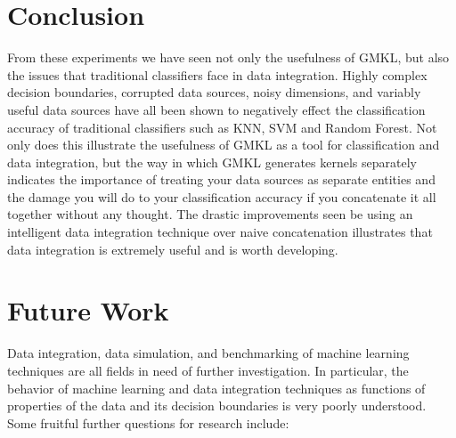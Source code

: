 \documentclass{article}
\begin{document}
\section*{Conclusion}
From these experiments we have seen not only the usefulness of GMKL, but also the issues that traditional classifiers face in data integration. Highly complex decision boundaries, corrupted data sources, noisy dimensions, and variably useful data sources have all been shown to negatively effect the classification accuracy of traditional classifiers such as KNN, SVM and Random Forest. Not only does this illustrate the usefulness of GMKL as a tool for classification and data integration, but the way in which GMKL generates kernels separately indicates the importance of treating your data sources as separate entities and the damage you will do to your classification accuracy if you concatenate it all together without any thought. The drastic improvements seen be using an intelligent data integration technique over naive concatenation illustrates that data integration is extremely useful and is worth developing. 


\section*{Future Work}
Data integration, data simulation, and benchmarking of machine learning techniques are all fields in need of further investigation. In particular, the behavior of machine learning and data integration techniques as functions of properties of the data and its decision boundaries is very poorly understood. Some fruitful further questions for research include:
\end{document}
